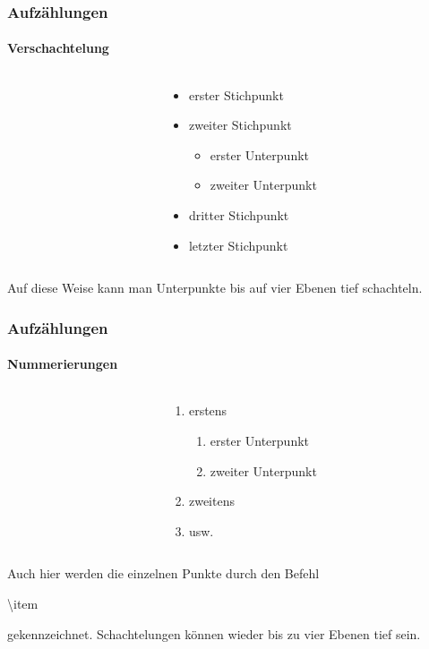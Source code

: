 \begin{frame}
\frametitle{Aufzählungen}
\framesubtitle{Verschachtelung}

\begin{columns}
\begin{column}{.5\textwidth}
\begin{ttfamily}%

\end{ttfamily}
\end{column}
\begin{column}{.5\textwidth}
\begin{itemize}
\item erster Stichpunkt
\item zweiter Stichpunkt
\begin{itemize}
\item erster Unterpunkt
\item zweiter Unterpunkt
\end{itemize}
\item dritter Stichpunkt
\item letzter Stichpunkt
\end{itemize}
\end{column}
\end{columns}
\bigskip
Auf diese Weise kann man Unterpunkte bis auf vier Ebenen tief schachteln.
\end{frame}


\begin{frame}
\frametitle{Aufzählungen}
\framesubtitle{Nummerierungen}

\begin{columns}
\begin{column}{.5\textwidth}
\begin{ttfamily}%

\end{ttfamily}
\end{column}
\begin{column}{.5\textwidth}
\begin{enumerate}
\item erstens
\begin{enumerate}
\item erster Unterpunkt
\item zweiter Unterpunkt
\end{enumerate}
\item zweitens
\item usw.
\end{enumerate}
\end{column}
\end{columns}
\bigskip
Auch hier werden die einzelnen Punkte durch den Befehl \begin{ttfamily}\color{nounibaredI}\textbackslash item\color{black}\end{ttfamily} gekennzeichnet. 
Schachtelungen können wieder bis zu vier Ebenen tief sein.
\end{frame}

